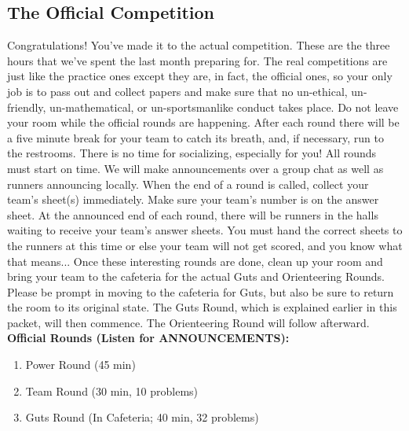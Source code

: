 \documentclass[11pt]{article}
\begin{document}
\begin{small}
\section{The Official Competition}
\noindent Congratulations! You've made it to the actual competition. These are the three hours that we've
spent the last month preparing for. The real competitions are just like the practice ones except they are, in fact, the official ones, so your only job is to pass out and collect papers and make sure that no un-ethical, un-friendly, un-mathematical, or un-sportsmanlike conduct takes place. Do not leave your room while the official rounds are happening. After each round there will be a five minute break for your team to catch its breath, and, if necessary, run to the restrooms. There is no time for socializing, especially for you!  All rounds must start on time. We will make announcements over a group chat as well as runners announcing locally. When the end of a round is called, collect your team's sheet(s) immediately. Make sure your team's number is on the answer sheet. At the announced end of each round, there will be runners in the halls waiting to receive your team's answer sheets. You must hand the correct sheets to the runners at this time or else your team will not get scored, and you know what that means... Once these interesting rounds are done, clean up your room and bring your team to the cafeteria for the actual Guts and Orienteering Rounds. Please be prompt in moving to the cafeteria for Guts, but also be sure to return the room to its original state. The Guts Round, which is explained earlier in this packet, will then commence. The Orienteering Round will follow afterward. \\

\noindent \textbf{Official Rounds (Listen for ANNOUNCEMENTS): }
\begin{enumerate}
  \item Power Round (45 min)
  \item Team Round (30 min, 10 problems)
  \item Guts Round (In Cafeteria; 40 min, 32 problems)
\end{enumerate}


\end{small}
\end{document}
